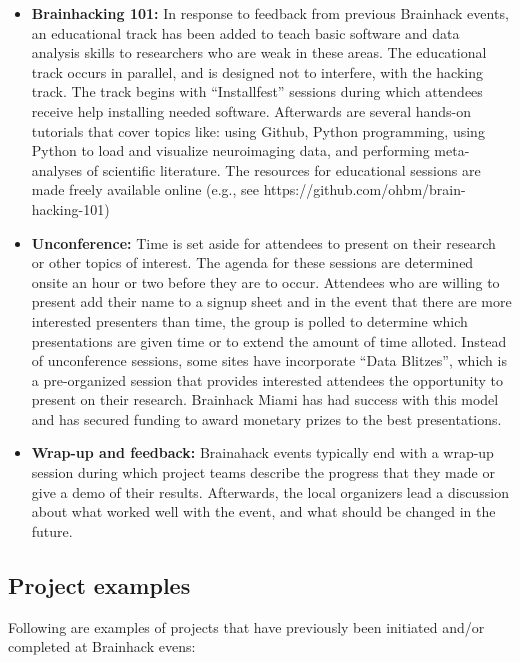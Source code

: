 \documentclass[11pt]{bmc_article_s50}
\begin{document}
\begin{itemize}
\item
  \textbf{Brainhacking 101:} In response to feedback from previous
  Brainhack events, an educational track has been added to teach basic
  software and data analysis skills to researchers who are weak in these
  areas. The educational track occurs in parallel, and is designed not
  to interfere, with the hacking track. The track begins with
  ``Installfest'' sessions during which attendees receive help
  installing needed software. Afterwards are several hands-on tutorials
  that cover topics like: using Github, Python programming, using Python
  to load and visualize neuroimaging data, and performing meta-analyses
  of scientific literature. The resources for educational sessions are 
  made freely available online (e.g., see https://github.com/ohbm/brain-hacking-101)
\item
  \textbf{Unconference:} Time is set aside for attendees to present on
  their research or other topics of interest. The agenda for these
  sessions are determined onsite an hour or two before they are to
  occur. Attendees who are willing to present add their name to a signup
  sheet and in the event that there are more interested presenters than
  time, the group is polled to determine which presentations are given
  time or to extend the amount of time alloted. Instead of unconference
  sessions, some sites have incorporate ``Data Blitzes'', which is a
  pre-organized session that provides interested attendees the
  opportunity to present on their research. Brainhack Miami has had success
  with this model and has secured funding to award monetary prizes to the 
  best presentations.
\item
  \textbf{Wrap-up and feedback:} Brainahack events typically end with a
  wrap-up session during which project teams describe the progress that
  they made or give a demo of their results. Afterwards, the local
  organizers lead a discussion about what worked well with the event,
  and what should be changed in the future.
\end{itemize}

\subsection{Project examples}\label{project-examples}

Following are examples of projects that have previously been initiated
and/or completed at Brainhack evens:
\end{document}
